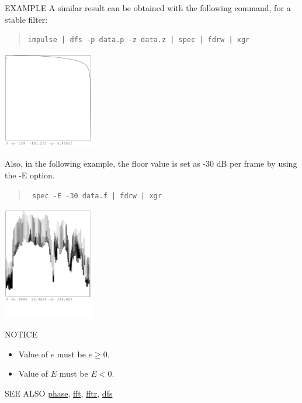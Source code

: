 \begin{qsection}{EXAMPLE}
A similar result can be obtained with the following command,
 for a stable filter:
\begin{quote}
  \verb!impulse | dfs -p data.p -z data.z | spec | fdrw | xgr !
\end{quote}
\begin{center}
\includegraphics[width=4cm]{fig/spec_3.pdf}
\end{center}
Also, in the following example, the floor value is set as -30 dB per frame by using the -E option.
 \begin{quote}
 \verb! spec -E -30 data.f | fdrw | xgr !
 \end{quote}
\begin{center}
\includegraphics[width=4cm]{fig/spec_4.pdf}
\end{center}


\end{qsection}

\begin{qsection}{NOTICE}
\begin{itemize}
\item Value of $e$ must be $e \geq 0$.
\item Value of $E$ must be $E < 0$.
\end{itemize}
\end{qsection}

\begin{qsection}{SEE ALSO}
\hyperlink{phase}{phase},
\hyperlink{fft}{fft},
\hyperlink{fftr}{fftr},
\hyperlink{dfs}{dfs}
\end{qsection}
